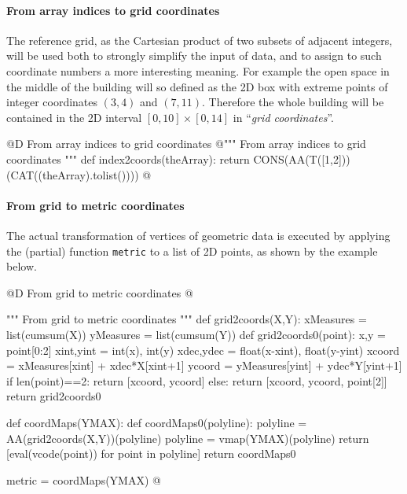 \documentclass[11pt,oneside]{article}    %
\begin{document}
\paragraph{From array indices to grid coordinates}

The reference grid, as the Cartesian product of two subsets of adjacent integers, will be used both to strongly simplify the input of data, and to assign to such coordinate numbers a more interesting meaning. For example the open space in the middle of the building will so defined as the 2D box with extreme points of integer coordinates $(3,4)$ and $(7,11)$.
Therefore the whole building  will be contained in the 2D interval $[0,10]\times [0,14]$ in ``\emph{grid coordinates}''.

@D From array indices to grid coordinates
@{""" From array indices to grid coordinates """
def index2coords(theArray):
    return CONS(AA(T([1,2]))(CAT((theArray).tolist())))
@}


\paragraph{From grid to metric coordinates}
The actual transformation of vertices of geometric data is executed by applying the (partial) function \texttt{metric} to a list of 2D points, as shown by the example below.

@D From grid to metric coordinates
@{""" From grid to metric coordinates """
def grid2coords(X,Y):
    xMeasures = list(cumsum(X))
    yMeasures = list(cumsum(Y))
    def grid2coords0(point):
        x,y = point[0:2]
        xint,yint = int(x), int(y)
        xdec,ydec = float(x-xint), float(y-yint)
        xcoord = xMeasures[xint] + xdec*X[xint+1]
        ycoord = yMeasures[yint] + ydec*Y[yint+1]
        if len(point)==2: return [xcoord, ycoord]
        else: return [xcoord, ycoord, point[2]]
    return grid2coords0

def coordMaps(YMAX):
    def coordMaps0(polyline):
        polyline = AA(grid2coords(X,Y))(polyline)
        polyline = vmap(YMAX)(polyline)
        return [eval(vcode(point)) for point in polyline]
    return coordMaps0

metric = coordMaps(YMAX)
@}
\end{document}
